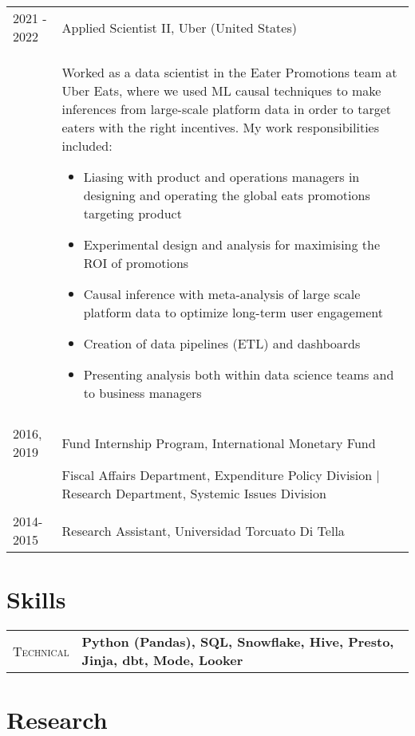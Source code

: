 \documentclass[letterpaper,9pt]{article} %
\begin{document}
\begin{tabular}{>{\raggedleft\arraybackslash}p{}|p{}}
	\textsc{2021 - 2022} & Applied Scientist II, Uber (United States) \\
	& \footnotesize{Worked as a data scientist in the Eater Promotions team at Uber Eats, where we used ML causal techniques to make inferences from large-scale platform data in order to target eaters with the right incentives. My work responsibilities included:
		\begin{itemize} 
			\item Liasing with product and operations managers in designing and operating the global eats promotions targeting product
			\item Experimental design and analysis for maximising the ROI of promotions
			\item Causal inference with meta-analysis of large scale platform data to optimize long-term user engagement
			\item Creation of data pipelines (ETL) and dashboards
			\item Presenting analysis both within data science teams and to business managers
		\end{itemize}} 	\\
	
	& \\
	
	\textsc{2016, 2019} & Fund Internship Program, International Monetary Fund \\ & \footnotesize{Fiscal Affairs Department, Expenditure Policy Division | Research Department, Systemic Issues Division} \\
	
	& \\
	
	\textsc{2014-2015} & Research Assistant, Universidad Torcuato Di Tella \\

\end{tabular}

	
\section{Skills}
\begin{tabular}[htb]{>{\raggedleft\arraybackslash}p{}|p{}}
	\textsc{Technical} & \textbf{Python (Pandas), SQL, Snowflake, Hive, Presto, Jinja, dbt, Mode, Looker}
\end{tabular}

\section{Research}
\end{document}
